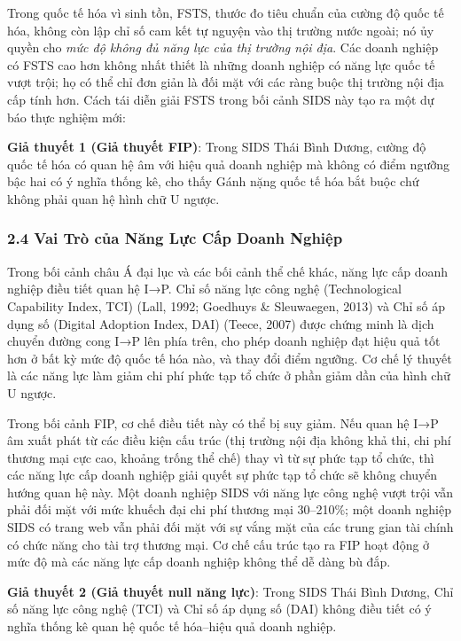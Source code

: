 \documentclass[12pt,a4paper]{article}
\begin{document}
Trong quốc tế hóa vì sinh tồn, FSTS, thước đo tiêu chuẩn của cường độ
quốc tế hóa, không còn lập chỉ số cam kết tự nguyện vào thị trường nước
ngoài; nó ủy quyền cho \emph{mức độ không đủ năng lực của thị trường nội
địa}. Các doanh nghiệp có FSTS cao hơn không nhất thiết là những doanh
nghiệp có năng lực quốc tế vượt trội; họ có thể chỉ đơn giản là đối mặt
với các ràng buộc thị trường nội địa cấp tính hơn. Cách tái diễn giải
FSTS trong bối cảnh SIDS này tạo ra một dự báo thực nghiệm mới:

\textbf{Giả thuyết 1 (Giả thuyết FIP)}: Trong SIDS Thái Bình Dương,
cường độ quốc tế hóa có quan hệ âm với hiệu quả doanh nghiệp mà không có
điểm ngưỡng bậc hai có ý nghĩa thống kê, cho thấy Gánh nặng quốc tế hóa
bắt buộc chứ không phải quan hệ hình chữ U ngược.

\hypertarget{24-vai-truxf2-cux1ee7a-nux103ng-lux1ef1c-cux1ea5p-doanh-nghiux1ec7p}{%
\subsubsection{2.4 Vai Trò của Năng Lực Cấp Doanh
Nghiệp}\label{24-vai-truxf2-cux1ee7a-nux103ng-lux1ef1c-cux1ea5p-doanh-nghiux1ec7p}}

Trong bối cảnh châu Á đại lục và các bối cảnh thể chế khác, năng lực cấp
doanh nghiệp điều tiết quan hệ I→P. Chỉ số năng lực công nghệ
(Technological Capability Index, TCI) (Lall, 1992; Goedhuys \&
Sleuwaegen, 2013) và Chỉ số áp dụng số (Digital Adoption Index, DAI)
(Teece, 2007) được chứng minh là dịch chuyển đường cong I→P lên phía
trên, cho phép doanh nghiệp đạt hiệu quả tốt hơn ở bất kỳ mức độ quốc tế
hóa nào, và thay đổi điểm ngưỡng. Cơ chế lý thuyết là các năng lực làm
giảm chi phí phức tạp tổ chức ở phần giảm dần của hình chữ U ngược.

Trong bối cảnh FIP, cơ chế điều tiết này có thể bị suy giảm. Nếu quan hệ
I→P âm xuất phát từ các điều kiện cấu trúc (thị trường nội địa không khả
thi, chi phí thương mại cực cao, khoảng trống thể chế) thay vì từ sự
phức tạp tổ chức, thì các năng lực cấp doanh nghiệp giải quyết sự phức
tạp tổ chức sẽ không chuyển hướng quan hệ này. Một doanh nghiệp SIDS với
năng lực công nghệ vượt trội vẫn phải đối mặt với mức khuếch đại chi phí
thương mại 30--210\%; một doanh nghiệp SIDS có trang web vẫn phải đối
mặt với sự vắng mặt của các trung gian tài chính có chức năng cho tài
trợ thương mại. Cơ chế cấu trúc tạo ra FIP hoạt động ở mức độ mà các
năng lực cấp doanh nghiệp không thể dễ dàng bù đắp.

\textbf{Giả thuyết 2 (Giả thuyết null năng lực)}: Trong SIDS Thái Bình
Dương, Chỉ số năng lực công nghệ (TCI) và Chỉ số áp dụng số (DAI) không
điều tiết có ý nghĩa thống kê quan hệ quốc tế hóa--hiệu quả doanh
nghiệp.
\end{document}
